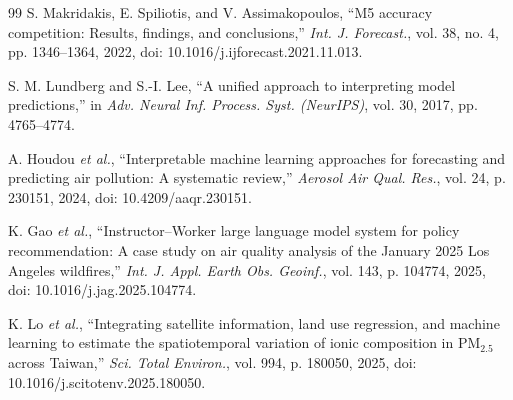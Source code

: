 \begin{thebibliography}{99}
S. Makridakis, E. Spiliotis, and V. Assimakopoulos, ``M5 accuracy competition: Results, findings, and conclusions,'' \emph{Int. J. Forecast.}, vol. 38, no. 4, pp. 1346--1364, 2022, doi: 10.1016/j.ijforecast.2021.11.013.

S. M. Lundberg and S.-I. Lee, ``A unified approach to interpreting model predictions,'' in \emph{Adv. Neural Inf. Process. Syst. (NeurIPS)}, vol. 30, 2017, pp. 4765--4774.

A. Houdou \emph{et al.}, ``Interpretable machine learning approaches for forecasting and predicting air pollution: A systematic review,'' \emph{Aerosol Air Qual. Res.}, vol. 24, p. 230151, 2024, doi: 10.4209/aaqr.230151.

K. Gao \emph{et al.}, ``Instructor--Worker large language model system for policy recommendation: A case study on air quality analysis of the January 2025 Los Angeles wildfires,'' \emph{Int. J. Appl. Earth Obs. Geoinf.}, vol. 143, p. 104774, 2025, doi: 10.1016/j.jag.2025.104774.

K. Lo \emph{et al.}, ``Integrating satellite information, land use regression, and machine learning to estimate the spatiotemporal variation of ionic composition in $\text{PM}_{2.5}$ across Taiwan,'' \emph{Sci. Total Environ.}, vol. 994, p. 180050, 2025, doi: 10.1016/j.scitotenv.2025.180050.

\end{thebibliography}
